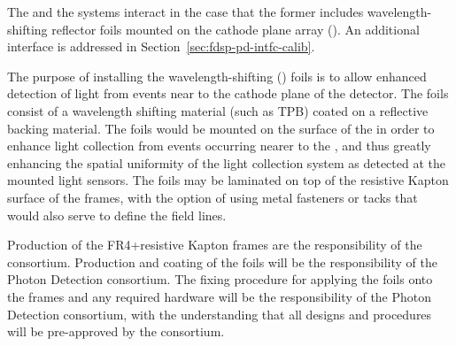 


The  and the  systems interact in the case that the former includes wavelength-shifting reflector foils mounted on the cathode plane array (). An additional interface is addressed in Section~\ref{sec:fdsp-pd-intfc-calib}.

The purpose of installing the wavelength-shifting () foils is to allow enhanced detection of light from events near to the cathode plane of the detector. The  foils consist of a wavelength shifting material (such as TPB) coated on a reflective backing material. The foils would be mounted on the surface of the  in order to enhance light collection from events occurring nearer to the , and thus greatly enhancing the spatial uniformity of the light collection system as detected at the  mounted light sensors. The foils may be laminated on top of the resistive Kapton surface of the  frames, with the option of using metal fasteners or tacks that would also serve to define the field lines. 

Production of the FR4+resistive Kapton  frames are the responsibility of the  consortium. Production and  coating of the  foils will be the responsibility of the Photon Detection consortium. The fixing procedure for applying the  foils onto the  frames and any required hardware will be the responsibility of the Photon Detection consortium, with the understanding that all designs and procedures will be pre-approved by the  consortium. 

